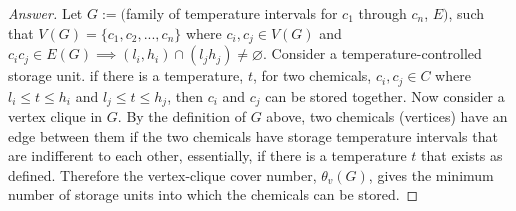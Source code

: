 \documentclass[12pt]{article}
\begin{document}
\begin{proof}[Answer]
Let $G := ($family of temperature intervals for $c_1$ through $c_n$, $E)$, such that $V(G)=\{c_1,c_2,...,c_n\}$ where $c_i,c_j\in V(G)$ and $c_ic_j \in E(G) \implies (l_i,h_i) \cap (l_jh_j) \neq \varnothing$. Consider a temperature-controlled storage unit. if there is a temperature, $t$, for two chemicals, $c_i,c_j\in C$ where $l_i \leq t \leq h_i$ and $l_j \leq t \leq h_j$, then $c_i$ and $c_j$ can be stored together. Now consider a vertex clique in $G$. By the definition of $G$ above, two chemicals (vertices) have an edge between them if the two chemicals have storage temperature intervals that are indifferent to each other, essentially, if there is a temperature $t$ that exists as defined. Therefore the vertex-clique cover number, $\theta_v(G)$, gives the minimum number of storage units into which the chemicals can be stored.
\end{proof}
\end{document}
